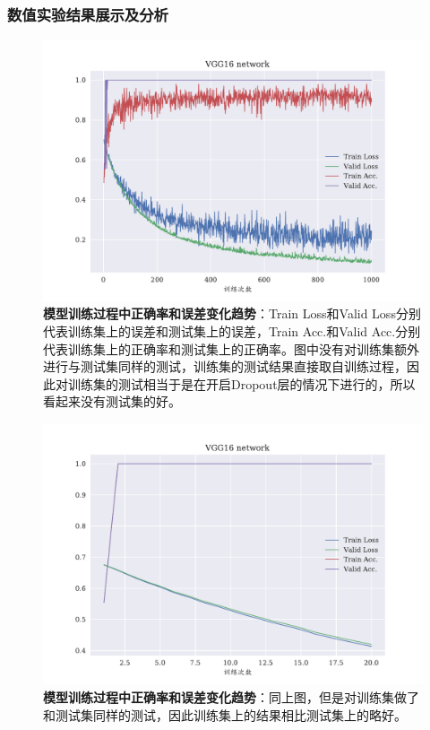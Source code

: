 \subsubsection{数值实验结果展示及分析}
\begin{figure}[H]
	\centering
	\includegraphics[width=\linewidth]{../figures/classifier/1.pdf}
	\caption{\textbf{模型训练过程中正确率和误差变化趋势}：Train Loss和Valid Loss分别代表训练集上的误差和测试集上的误差，Train Acc.和Valid Acc.分别代表训练集上的正确率和测试集上的正确率。图中没有对训练集额外进行与测试集同样的测试，训练集的测试结果直接取自训练过程，因此对训练集的测试相当于是在开启Dropout层的情况下进行的，所以看起来没有测试集的好。}
	\label{fig:c1}
\end{figure}

\begin{figure}[H]
	\centering
	\includegraphics[width=0.95\linewidth]{../figures/classifier/2.pdf}
	\caption{\textbf{模型训练过程中正确率和误差变化趋势}：同上图，但是对训练集做了和测试集同样的测试，因此训练集上的结果相比测试集上的略好。}
	\label{fig:c2}
\end{figure}

